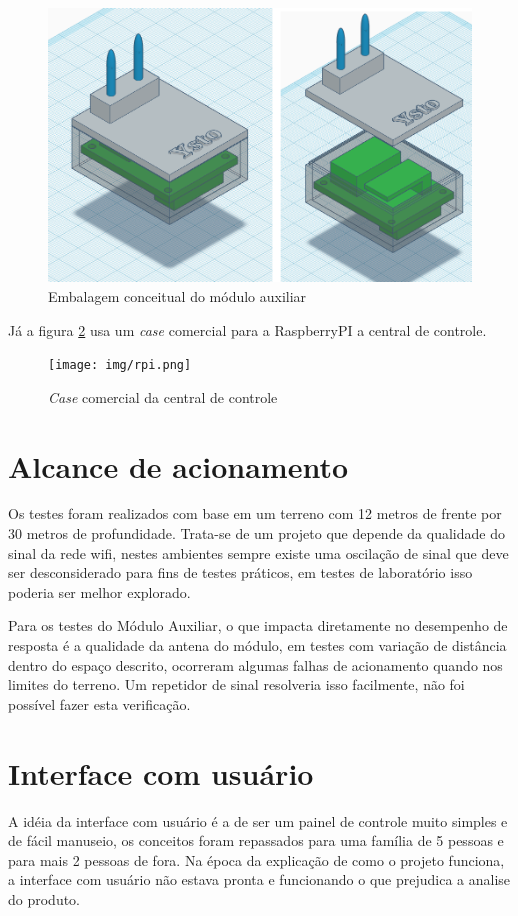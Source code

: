 \begin{figure}[H]
\caption{\label{prod-conceitual-01} Embalagem conceitual do módulo auxiliar}
\includegraphics[scale=0.35]{img/12-prod-conceitual.png}
\end{figure}

Já a figura \ref{prod-rpi} usa um \textit{case} comercial para a RaspberryPI a central de controle.

\begin{figure}[H]
\caption{\label{prod-rpi} \textit{Case} comercial da central de controle}
\texttt{[image: img/rpi.png]}
\end{figure}


\section{Alcance de acionamento}
Os testes foram realizados com base em um terreno com 12 metros de frente por 30 metros de profundidade. Trata-se de um projeto que depende da qualidade do sinal da rede wifi, nestes ambientes sempre existe uma oscilação de sinal que deve ser desconsiderado para fins de testes práticos, em testes de laboratório isso poderia ser melhor explorado.

Para os testes do Módulo Auxiliar, o que impacta diretamente no desempenho de resposta é a qualidade da antena do módulo, em testes com variação de distância dentro do espaço descrito, ocorreram algumas falhas de acionamento quando nos limites do terreno. Um repetidor de sinal resolveria isso facilmente, não foi possível fazer esta verificação.

\section{Interface com usuário}
A idéia da interface com usuário é a de ser um painel de controle muito simples e de fácil manuseio, os conceitos foram repassados para uma família de 5 pessoas e para mais 2 pessoas de fora. Na época da explicação de como o projeto funciona, a interface com usuário não estava pronta e funcionando o que prejudica a analise do produto.

